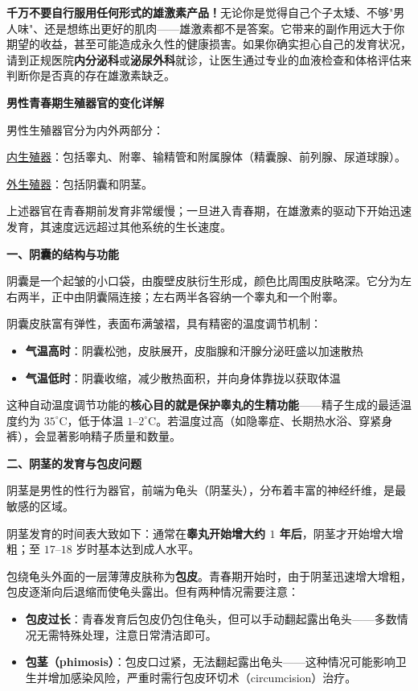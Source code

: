 \begin{tcolorbox}[colback=pink!5!white,colframe=red!50!black,title=贴心小叮咛]
\textbf{千万不要自行服用任何形式的雄激素产品！}无论你是觉得自己个子太矮、不够"男人味"、还是想练出更好的肌肉——雄激素都不是答案。它带来的副作用远大于你期望的收益，甚至可能造成永久性的健康损害。如果你确实担心自己的发育状况，请到正规医院\textbf{内分泌科}或\textbf{泌尿外科}就诊，让医生通过专业的血液检查和体格评估来判断你是否真的存在雄激素缺乏。
\end{tcolorbox}

\vspace{0.8em}
\noindent\textbf{男性青春期生殖器官的变化详解}

男性生殖器官分为内外两部分：

\underline{内生殖器}：包括睾丸、附睾、输精管和附属腺体（精囊腺、前列腺、尿道球腺）。

\underline{外生殖器}：包括阴囊和阴茎。

上述器官在青春期前发育非常缓慢；一旦进入青春期，在雄激素的驱动下开始迅速发育，其速度远远超过其他系统的生长速度。

\vspace{0.3em}
\noindent\textbf{一、阴囊的结构与功能}

阴囊是一个起皱的小口袋，由腹壁皮肤衍生形成，颜色比周围皮肤略深。它分为左右两半，正中由阴囊隔连接；左右两半各容纳一个睾丸和一个附睾。

阴囊皮肤富有弹性，表面布满皱褶，具有精密的温度调节机制：
\begin{itemize}
	\item \textbf{气温高时}：阴囊松弛，皮肤展开，皮脂腺和汗腺分泌旺盛以加速散热
	\item \textbf{气温低时}：阴囊收缩，减少散热面积，并向身体靠拢以获取体温
\end{itemize}

这种自动温度调节功能的\textbf{核心目的就是保护睾丸的生精功能}——精子生成的最适温度约为 $35^\circ\text{C}$，低于体温 $1$--$2^\circ\text{C}$。若温度过高（如隐睾症、长期热水浴、穿紧身裤），会显著影响精子质量和数量。

\vspace{0.3em}
\noindent\textbf{二、阴茎的发育与包皮问题}

阴茎是男性的性行为器官，前端为龟头（阴茎头），分布着丰富的神经纤维，是最敏感的区域。

阴茎发育的时间表大致如下：通常在\textbf{睾丸开始增大约 $1$ 年后}，阴茎才开始增大增粗；至 $17$--$18$ 岁时基本达到成人水平。

包绕龟头外面的一层薄薄皮肤称为\textbf{包皮}。青春期开始时，由于阴茎迅速增大增粗，包皮逐渐向后退缩而使龟头露出。但有两种情况需要注意：
\begin{itemize}
	\item \textbf{包皮过长}：青春发育后包皮仍包住龟头，但可以手动翻起露出龟头——多数情况无需特殊处理，注意日常清洁即可。
	\item \textbf{包茎（phimosis）}：包皮口过紧，无法翻起露出龟头——这种情况可能影响卫生并增加感染风险，严重时需行包皮环切术（circumcision）治疗。
\end{itemize}

